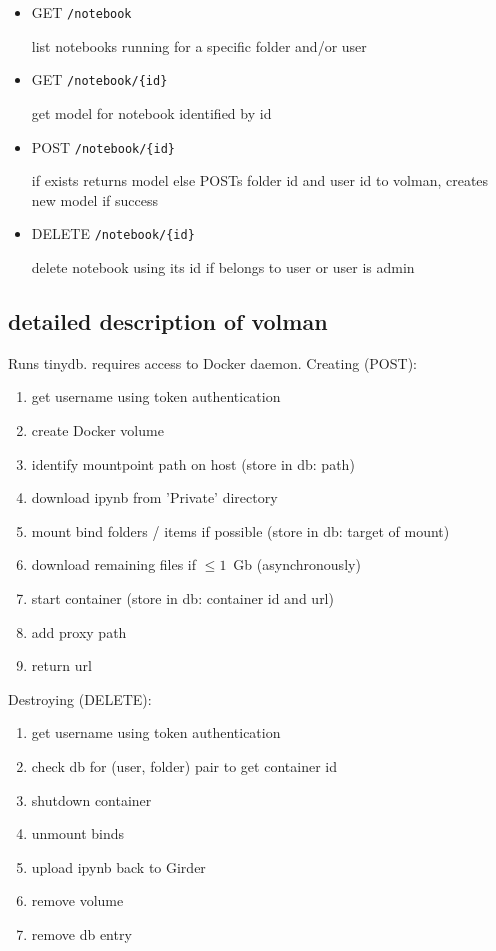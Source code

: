 \documentclass[conference]{IEEEtran}
\begin{document}
\begin{itemize}
\item GET \verb!/notebook!

list notebooks running for a specific folder and/or user

\item GET \verb!/notebook/{id}!

get model for notebook identified by id

\item POST \verb!/notebook/{id}!

if exists returns model else POSTs folder id and user id to volman, creates new
model if success

\item DELETE \verb!/notebook/{id}!

delete notebook using its id if belongs to user or user is admin

\end{itemize}

\subsection{detailed description of volman}

Runs tinydb. requires access to Docker daemon. Creating (POST):
\begin{enumerate}
   \item get username using token authentication
   \item create Docker volume
   \item identify mountpoint path on host (store in db: path)
   \item download ipynb from 'Private' directory
   \item mount bind folders / items if possible (store in db: target of mount)
   \item download remaining files if $\le 1$~Gb (asynchronously)
   \item start container (store in db: container id and url)
   \item add proxy path
   \item return url
\end{enumerate}

Destroying (DELETE):
\begin{enumerate}
   \item get username using token authentication
   \item check db for (user, folder) pair to get container id
   \item shutdown container
   \item unmount binds
   \item upload ipynb back to Girder
   \item remove volume
   \item remove db entry
\end{enumerate}
\end{document}
